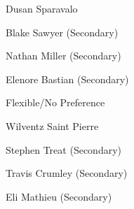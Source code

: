 \begin{DoxyEnumerate}
\begin{DoxyItemize}
\item Dusan Sparavalo
\item Blake Sawyer (Secondary)
\item Nathan Miller (Secondary)
\item Elenore Bastian (Secondary)
\end{DoxyItemize}
\item Flexible/\+No Preference
\begin{DoxyItemize}
\item Wilventz Saint Pierre
\item Stephen Treat (Secondary)
\item Travis Crumley (Secondary)
\item Eli Mathieu (Secondary) 
\end{DoxyItemize}
\end{DoxyEnumerate}